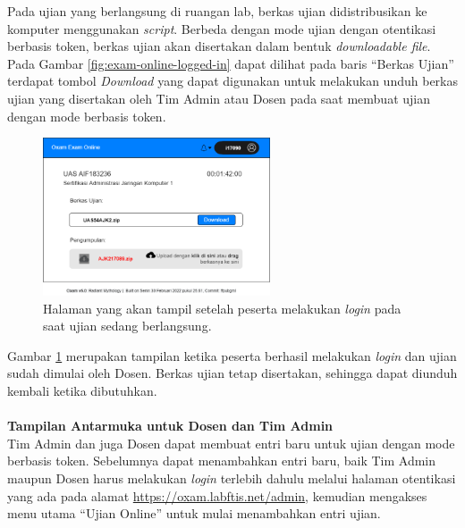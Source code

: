 \documentclass[a4paper,twoside]{article}
\begin{document}
\begin{enumerate}
\begin{itemize}
\begin{itemize}
		        Pada ujian yang berlangsung di ruangan lab, berkas ujian didistribusikan ke komputer menggunakan \textit{script}. Berbeda dengan mode ujian dengan otentikasi berbasis token, berkas ujian akan disertakan dalam bentuk \textit{downloadable file}. Pada Gambar \ref{fig:exam-online-logged-in} dapat dilihat pada baris ``Berkas Ujian'' terdapat tombol \textit{Download} yang dapat digunakan untuk melakukan unduh berkas ujian yang disertakan oleh Tim Admin atau Dosen pada saat membuat ujian dengan mode berbasis token.
		        
		        
                \begin{figure}[ht]
                    \centering
                    \includegraphics[width=0.6\textwidth]{images/ui designs/exam-online/exam-started-2.png}
                    \caption{Halaman yang akan tampil setelah peserta melakukan \textit{login} pada saat ujian sedang berlangsung. }
                    \label{fig:exam-online-exam-started}
                \end{figure}
		        
		        Gambar \ref{fig:exam-online-exam-started} merupakan tampilan ketika peserta berhasil melakukan \textit{login} dan ujian sudah dimulai oleh Dosen. Berkas ujian tetap disertakan, sehingga dapat diunduh kembali ketika dibutuhkan.
		        \\
		        \\
		        \textbf{Tampilan Antarmuka untuk Dosen dan Tim Admin}\\
		        Tim Admin dan juga Dosen dapat membuat entri baru untuk ujian dengan mode berbasis token. Sebelumnya dapat menambahkan entri baru, baik Tim Admin maupun Dosen harus melakukan \textit{login} terlebih dahulu melalui halaman otentikasi yang ada pada alamat \url{https://oxam.labftis.net/admin}, kemudian mengakses menu utama ``Ujian Online'' untuk mulai menambahkan entri ujian.
		        

\end{itemize}
\end{itemize}
\end{enumerate}
\end{document}
